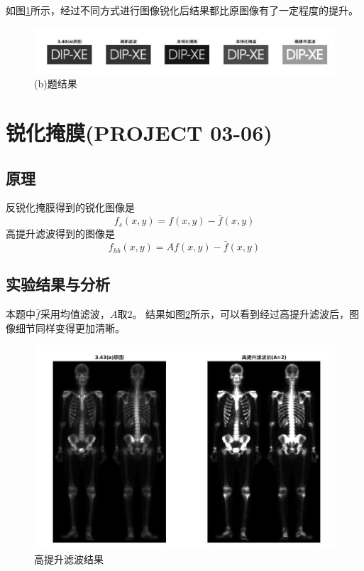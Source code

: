 \documentclass[logo,reportComp]{thesis}
\begin{document}
如图\ref{fig:b}所示，经过不同方式进行图像锐化后结果都比原图像有了一定程度的提升。
\begin{figure}[H]
\centering
\includegraphics[width=\linewidth]{b.jpg}
\caption{(b)题结果}
\label{fig:b}
\end{figure}


\section{锐化掩膜(PROJECT 03-06)}
\subsection{原理}
反锐化掩膜得到的锐化图像是
\[f_s(x,y)=f(x,y)-\bar{f}(x,y)\]
高提升滤波得到的图像是
\[f_{hb}(x,y)=Af(x,y)-\bar{f}(x,y)\]

\subsection{实验结果与分析}
本题中$\bar{f}$采用均值滤波，$A$取$2$。
结果如图\ref{fig:res}所示，可以看到经过高提升滤波后，图像细节同样变得更加清晰。
\begin{figure}[H]
\centering
\includegraphics[width=\linewidth]{c.jpg}
\caption{高提升滤波结果}
\label{fig:res}
\end{figure}

\appendix\appendixconfig
\end{document}
